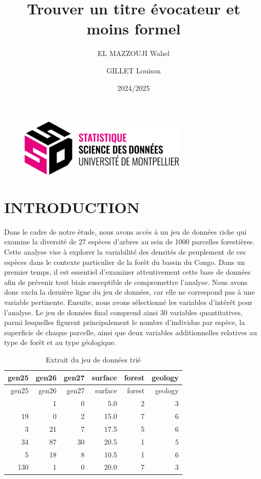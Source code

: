 \documentclass[
]{article}
\title{Trouver un titre évocateur et moins formel}
\author{EL MAZZOUJI Wahel \and GILLET Louison}
\date{2024/2025}
\begin{document}
\maketitle

\begin{figure}[h!]
    \centering
    \includegraphics[width=0.5\linewidth]{ssd.png}
\end{figure}

\newpage

\tableofcontents

\newpage

\hypertarget{introduction}{%
\section{INTRODUCTION}\label{introduction}}

Dans le cadre de notre étude, nous avons accès à un jeu de données riche
qui examine la diversité de 27 espèces d'arbres au sein de 1000
parcelles forestières. Cette analyse vise à explorer la variabilité des
densités de peuplement de ces espèces dans le contexte particulier de la
forêt du bassin du Congo. Dans un premier temps, il est essentiel
d'examiner attentivement cette base de données afin de prévenir tout
biais susceptible de compromettre l'analyse. Nous avons donc exclu la
dernière ligne du jeu de données, car elle ne correspond pas à une
variable pertinente. Ensuite, nous avons sélectionné les variables
d'intérêt pour l'analyse. Le jeu de données final comprend ainsi 30
variables quantitatives, parmi lesquelles figurent principalement le
nombre d'individus par espèce, la superficie de chaque parcelle, ainsi
que deux variables additionnelles relatives au type de forêt et au type
géologique.

\begin{longtable}[]{@{}rrrrrr@{}}
\caption{Extrait du jeu de données trié}\tabularnewline
\toprule\noalign{}
gen25 & gen26 & gen27 & surface & forest & geology \\
\midrule\noalign{}
\endfirsthead
\toprule\noalign{}
gen25 & gen26 & gen27 & surface & forest & geology \\
\midrule\noalign{}
\endhead
\bottomrule\noalign{}
\endlastfoot
32 & 1 & 0 & 5.0 & 2 & 3 \\
19 & 0 & 2 & 15.0 & 7 & 6 \\
3 & 21 & 7 & 17.5 & 5 & 6 \\
34 & 87 & 30 & 20.5 & 1 & 5 \\
5 & 18 & 8 & 10.5 & 1 & 6 \\
130 & 1 & 0 & 20.0 & 7 & 3 \\
\end{longtable}
\end{document}
